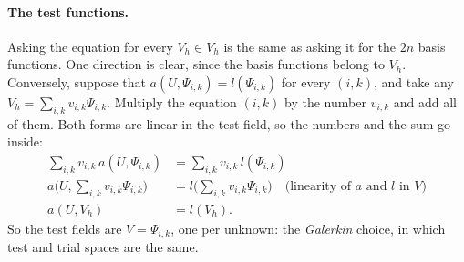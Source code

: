 \paragraph{The test functions.} Asking the equation for every $V_h \in V_h$ is the same as asking it for the $2n$ basis functions. One direction is clear, since the basis functions belong to $V_h$. Conversely, suppose that $a(U, \Psi_{i,k}) = l(\Psi_{i,k})$ for every $(i, k)$, and take any $V_h = \sum_{i,k} v_{i,k}\Psi_{i,k}$. Multiply the equation $(i, k)$ by the number $v_{i,k}$ and add all of them. Both forms are linear in the test field, so the numbers and the sum go inside:
\begin{align*}
\sum_{i,k} v_{i,k}\, a(U, \Psi_{i,k}) &= \sum_{i,k} v_{i,k}\, l(\Psi_{i,k}) \\
a\Big(U, \sum_{i,k} v_{i,k}\Psi_{i,k}\Big) &= l\Big(\sum_{i,k} v_{i,k}\Psi_{i,k}\Big) \quad \text{(linearity of $a$ and $l$ in $V$)}\\
a(U, V_h) &= l(V_h) .
\end{align*}
So the test fields are $V = \Psi_{i,k}$, one per unknown: the \emph{Galerkin} choice, in which test and trial spaces are the same.


